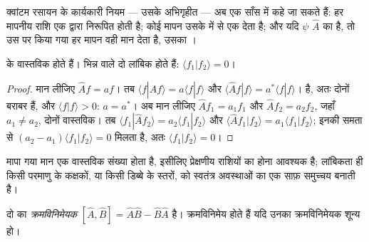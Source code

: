 क्वांटम रसायन के कार्यकारी नियम --- उसके अभिगृहीत --- अब एक साँस में कहे जा
सकते हैं: हर मापनीय राशि एक  द्वारा निरूपित होती है; कोई मापन
उसके  में से एक देता है; और यदि
$\psi$  $\hat A$ का  है, तो उस पर किया गया हर मापन वही
मान देता है, उसका ।

\begin{theorem}[हर्मिटी संकारक]\label{thm:b3:quantum-model-systems:hermitian-real}
 के  वास्तविक होते हैं। भिन्न  वाले दो
 लांबिक होते हैं: $\langle f_1|f_2\rangle = 0$।
\end{theorem}

\begin{proof}
मान लीजिए $\hat Af = af$। तब $\langle f|\hat Af\rangle = a\langle f|f\rangle$ और
$\langle\hat Af|f\rangle = a^*\langle f|f\rangle$।   है,
अतः दोनों बराबर हैं, और $\langle f|f\rangle > 0$: $a = a^*$। अब मान लीजिए $\hat Af_1
= a_1f_1$ और $\hat Af_2 = a_2f_2$, जहाँ $a_1 \ne a_2$, दोनों वास्तविक। तब
$\langle f_1|\hat Af_2\rangle = a_2\langle f_1|f_2\rangle$ और $\langle\hat Af_1|
f_2\rangle = a_1\langle f_1|f_2\rangle$; इनकी समता से $(a_2 - a_1)
\langle f_1|f_2\rangle = 0$ मिलता है, अतः $\langle f_1|f_2\rangle = 0$।
\end{proof}

मापा गया मान एक वास्तविक संख्या होता है, इसीलिए प्रेक्षणीय राशियों का 
होना आवश्यक है; लांबिकता ही किसी परमाणु के कक्षकों, या किसी डिब्बे के स्तरों, को
स्वतंत्र अवस्थाओं का एक साफ़ समुच्चय बनाती है।

\begin{definition}[क्रमविनिमेयक]\label{def:b3:quantum-model-systems:commutator}
दो  का \emph{क्रमविनिमेयक} $[\hat A,\hat B] =
\hat A\hat B - \hat B\hat A$ है।  क्रमविनिमेय होते हैं यदि उनका क्रमविनिमेयक
शून्य हो।
\end{definition}

